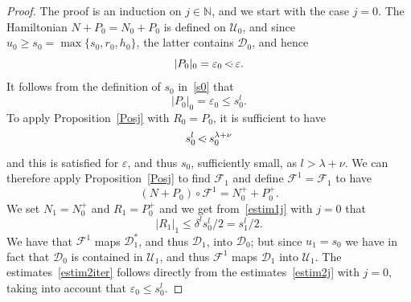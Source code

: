 \documentclass[JEP,XML,SOM,Unicode]{cedram}
\let\mathcal\mathscr
\numberwithin{equation}{section}
\theoremstyle{plain}
\theoremstyle{definition}
\newcommand{\N}{\mathbb{N}}
\newcommand\MP{\,{<\hspace{-.5em}\cdot}\,}
\begin{document}
\begin{proof}
The proof is an induction on $j \in \N$, and we start with the case $j=0$. The Hamiltonian $N+P_0=N_0+P_0$ is defined on $\mathcal{U}_0$, and since $u_0 \geq s_0=\max\{s_0,r_0,h_0\}$, the latter contains $\mathcal{D}_0$, and hence
\[ |P_0|_0=\varepsilon_0\MP \varepsilon. \]
It follows from the definition of $s_0$ in~\eqref{s0} that
\[ |P_0|_0=\varepsilon_0\leq s_0^l. \]
To apply Proposition~\ref{Posj} with $R_0=P_0$, it is sufficient to have
\begin{equation*}
s_0^l \MP s_0^{\lambda+\nu}
\end{equation*}
and this is satisfied for $\varepsilon$, and thus $s_0$, sufficiently small, as $l>\lambda+\nu$. We can therefore apply Proposition~\ref{Posj} to find $\mathcal{F}_1$ and define $\mathcal{F}^1=\mathcal{F}_1$ to have
\[(N+P_0) \circ \mathcal{F}^1=N_0^++P_0^+. \]
We set $N_1=N_0^+$ and $R_1=P_0^+$ and we get from~\eqref{estim1j} with $j=0$ that
\[ |R_1|_1 \leq \delta^ls_0^l/2= s_1^l/2. \]
We have that $\mathcal{F}^1$ maps $\mathcal{D}_1^*$, and thus $\mathcal{D}_1$, into $\mathcal{D}_0$; but since $u_1=s_0$ we have in fact that $\mathcal{D}_0$ is contained in $\mathcal{U}_1$, and thus $\mathcal{F}^1$ maps $\mathcal{D}_1$ into $\mathcal{U}_1$. The estimates~\eqref{estim2iter} follows directly from the estimates~\eqref{estim2j} with $j=0$, taking into account that $\varepsilon_0\leq s_0^l$.


\end{proof}
\end{document}
